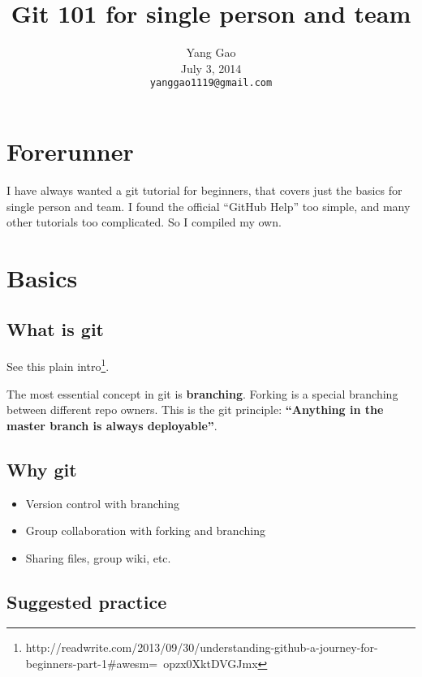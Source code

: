 \documentclass{article} %
\title{{Git 101 for single person and team}}
\author{
Yang Gao\\
July 3, 2014\\
\texttt{yanggao1119@gmail.com} \\
}
\newcommand{\q}[1]{``#1''}
\begin{document}
\maketitle

\section{Forerunner}
I have always wanted a git tutorial for beginners, that covers just the basics for single person and team. I found the official \q{GitHub Help} too simple, and many other tutorials too complicated. So I compiled my own.

\section{Basics}

\subsection{What is git}

See this plain intro\footnote{http://readwrite.com/2013/09/30/understanding-github-a-journey-for-beginners-part-1\#awesm=~opzx0XktDVGJmx}.

The most essential concept in git is \textbf{branching}. Forking is a special branching between different repo owners. This is the git principle:  \textbf{\q{Anything in the master branch is always deployable}}.

\subsection{Why git}
\begin{itemize}
	\item Version control with branching
	\item Group collaboration with forking and branching
	\item Sharing files, group wiki, etc.
\end{itemize}

\subsection{Suggested practice}
\end{document}
